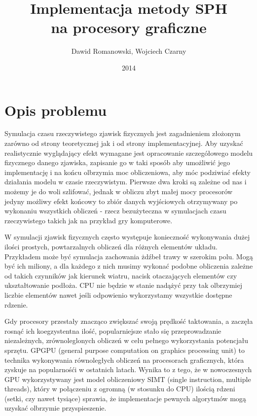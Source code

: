 \documentclass[polish, 12pt]{aghthesis}
\author{Dawid Romanowski, Wojciech Czarny}
\title{Implementacja metody SPH \\ na procesory graficzne}
\date{2014}
\begin{document}
\maketitle{}
\tableofcontents
\clearpage


\section{Opis problemu}

	Symulacja czasu rzeczywistego zjawisk fizycznych jest zagadnieniem złożonym zarówno od strony teoretycznej jak i od strony implementacyjnej. Aby uzyskać realistycznie wyglądający efekt wymagane jest opracowanie szczegółowego modelu fizycznego danego zjawiska, zapisanie go w taki sposób aby umożliwić jego implementację i na końcu olbrzymia moc obliczeniowa, aby móc podziwiać efekty działania modelu w czasie rzeczywistym. Pierwsze dwa kroki są zależne od nas i możemy je do woli szlifować, jednak w obliczu zbyt małej mocy procesorów jedyny możliwy efekt końcowy to zbiór danych wyjściowych otrzymywany po wykonaniu wszystkich obliczeń - rzecz bezużyteczna w symulacjach czasu rzeczywistego takich jak na przykład gry komputerowe.

	W symulacji zjawisk fizycznych często występuje konieczność wykonywania dużej ilości prostych, powtarzalnych obliczeń dla różnych elementów układu. Przykładem może być symulacja zachowania żdźbeł trawy w szerokim polu. Mogą być ich miliony, a dla każdego z nich musimy wykonać podobne obliczenia zależne od takich czynników jak kierunek wiatru, nacisk otaczających elementów czy ukształtowanie podłoża. CPU nie będzie w stanie nadążyć przy tak olbrzymiej liczbie elementów nawet jeśli odpowienio wykorzystamy wszystkie dostępne rdzenie. 
	

		Gdy procesory przestały znacząco zwiększać swoją prędkość taktowania, a zaczęła rosnąć ich koegzystentna ilość, popularniejsze stało się przeprowadzanie niezależnych, zrównoleglonych obliczeń w celu pełnego wykorzystania potencjału sprzętu. GPGPU (general purpose computation on graphics processing unit) to technika wykonywania równoległych obliczeń na procesorach graficznych, która zyskuje na popularnośći w ostatnich latach. Wynika to z tego, że w nowoczesnych GPU wykorzystywany jest model obliczeniowy SIMT (single instruction, multiple threads), który w połączeniu z ogromną (w stosunku do CPU) ilością rdzeni (setki, czy nawet tysiące) sprawia, że implementacje pewnych algorytmów mogą uzyskać olbrzymie przyspieszenie.
\end{document}
